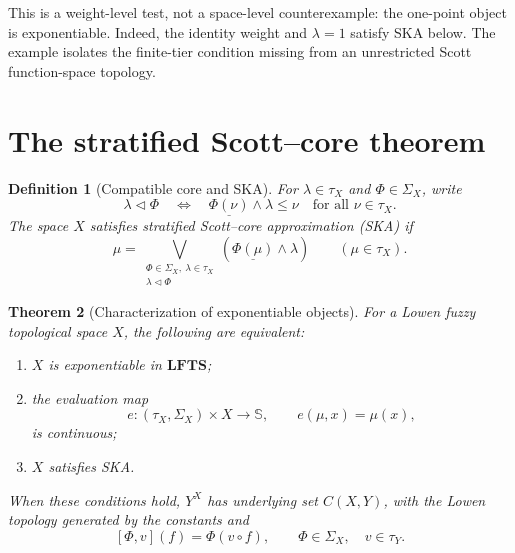 \documentclass[10pt,a4paper]{amsart}
\numberwithin{equation}{section}
\newtheorem{theorem}{Theorem}[section]
\newtheorem{definition}[theorem]{Definition}
\newcommand{\Sier}{\mathbb S}
\newcommand{\LFTS}{\mathbf{LFTS}}
\newcommand{\const}[1]{\underline{#1}}
\begin{document}
This is a weight-level test, not a space-level counterexample: the
one-point object is exponentiable.  Indeed, the identity weight and
\(\lambda=1\) satisfy SKA below.  The example isolates the finite-tier
condition missing from an unrestricted Scott function-space topology.

\section{The stratified Scott--core theorem}

\begin{definition}[Compatible core and SKA]\label{def:ska-en}
For \(\lambda\in\tau_X\) and \(\Phi\in\Sigma_X\), write
\begin{equation}\label{eq:triangle-en}
 \lambda\triangleleft\Phi
 \quad\Longleftrightarrow\quad
 \const{\Phi(\nu)}\wedge\lambda\leq\nu
 \quad\text{for all }\nu\in\tau_X.
\end{equation}
The space \(X\) satisfies stratified Scott--core approximation (SKA) if
\begin{equation}\label{eq:ska-en}
  \mu=\bigvee_{\substack{\Phi\in\Sigma_X,\ \lambda\in\tau_X\\
                         \lambda\triangleleft\Phi}}
       (\const{\Phi(\mu)}\wedge\lambda)
 \qquad(\mu\in\tau_X).
\end{equation}
\end{definition}


\begin{theorem}[Characterization of exponentiable objects]
\label{thm:main-en}
For a Lowen fuzzy topological space \(X\), the following are equivalent:
\begin{enumerate}[label=(\roman*)]
 \item \(X\) is exponentiable in \(\LFTS\);
 \item the evaluation map
 \[
 e:(\tau_X,\Sigma_X)\times X\to\Sier,
 \qquad e(\mu,x)=\mu(x),
 \]
 is continuous;
 \item \(X\) satisfies SKA.
\end{enumerate}
When these conditions hold, \(Y^X\) has underlying set \(C(X,Y)\),
with the Lowen topology generated by the constants and
\begin{equation}\label{eq:exp-gen-en}
 [\Phi,v](f)=\Phi(v\circ f),
 \qquad \Phi\in\Sigma_X,\quad v\in\tau_Y.
\end{equation}
\end{theorem}
\end{document}
